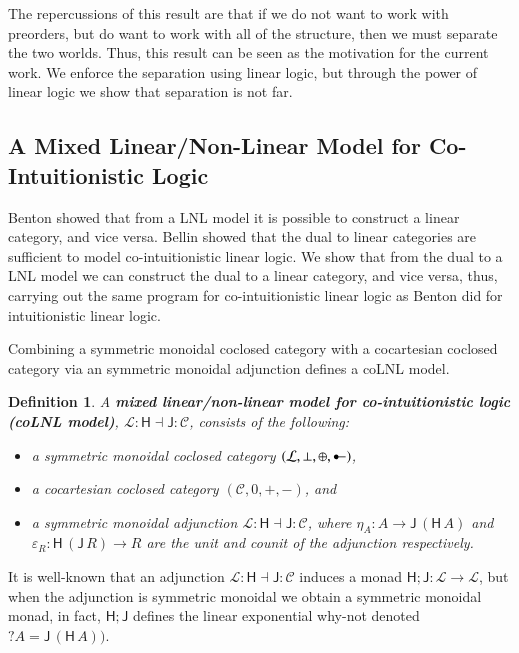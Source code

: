 \documentclass{lmcs}
\newtheorem{definition}[theorem]{Definition}
\let\mto\to
\let\to\relax
\newcommand{\to}{\rightarrow}
\newcommand{\cat}[1]{\mathcal{#1}}
\newcommand{\func}[1]{\mathsf{#1}}
\newcommand{\colimp}[0]{\multimapdotinv}
\begin{document}
The repercussions of this result are that if we do not want to work
with preorders, but do want to work with all of the structure, then we
must separate the two worlds.  Thus, this result can be seen as the
motivation for the current work.  We enforce the separation using
linear logic, but through the power of linear logic we show that
separation is not far.

\subsection{A Mixed Linear/Non-Linear Model for Co-Intuitionistic Logic}
\label{subsec:a_mixed_linear/non-linear_model_for_co-intuitionistic_logic}

Benton \cite{Benton:1994} showed that from a LNL model it is possible
to construct a linear category, and vice versa.  Bellin
\cite{Bellin:2012} showed that the dual to linear categories are
sufficient to model co-intuitionistic linear logic. We show that from
the dual to a LNL model we can construct the dual to a linear
category, and vice versa, thus, carrying out the same program for
co-intuitionistic linear logic as Benton did for intuitionistic linear
logic.

Combining a symmetric monoidal coclosed category with a cocartesian
coclosed category via an symmetric monoidal adjunction defines a coLNL
model.
\begin{definition}
  \label{def:coLNL-model}
  A
  \textbf{mixed linear/non-linear model for co-intuitionistic logic (coLNL model)},
  $\cat{L} : \func{H} \dashv \func{J} : \cat{C}$, consists of the following:
  \begin{itemize}
  \item[i.] a symmetric monoidal coclosed category $(\cat{L},\perp,\oplus,\colimp)$,
  \item[ii.] a cocartesian coclosed category $(\cat{C},0,+,-)$, and
  \item[iv.] a symmetric monoidal adjunction $\cat{L} : \func{H}
    \dashv \func{J} : \cat{C}$, where $\eta_A : A \mto
    \func{J}\,(\func{H}\,A)$ and $\varepsilon_R :
    \func{H}\,(\func{J}\,R) \mto R$ are the unit and counit of the adjunction
    respectively.
  \end{itemize}
\end{definition}
It is well-known that an adjunction $\cat{L} : \func{H} \dashv
\func{J} : \cat{C}$ induces a monad $\func{H};\func{J} : \cat{L} \mto
\cat{L}$, but when the adjunction is symmetric monoidal we obtain a
symmetric monoidal monad, in fact, $\func{H};\func{J}$ defines the
linear exponential why-not denoted $?A = \func{J}\,(\func{H}\,A))$.
\end{document}
